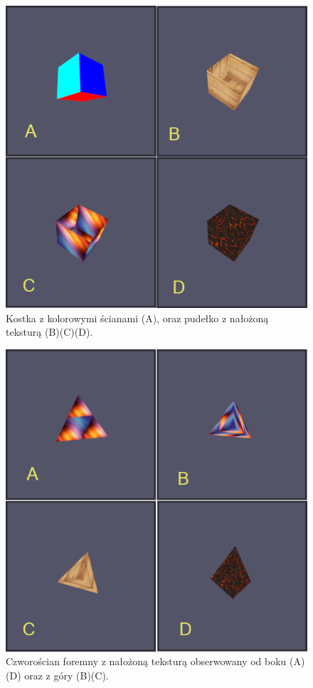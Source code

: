 \documentclass[a4paper,11pt]{article}
\begin{document}
\begin{figure}[h!]
    \centering
    \includegraphics[width=1.0\linewidth]{cube.png}
    \caption{Kostka z kolorowymi ścianami (A), oraz pudełko z nałożoną teksturą (B)(C)(D).}
    \label{fig:pic1}
\end{figure}
\newpage

\begin{figure}[h!]
    \centering
    \includegraphics[width=1.0\linewidth]{tetra.png}
    \caption{Czworościan foremny z nałożoną teksturą obserwowany od boku (A)(D) oraz z góry (B)(C).}
    \label{fig:pic2}
\end{figure}
\newpage
\end{document}

